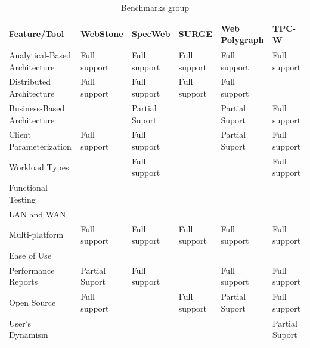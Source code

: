 \documentclass{report}
\begin{document}
\begin{table}[]
\centering
\caption{Benchmarks group}
\label{tab: tabtool1}
\begin{tabular}{|l|l|l|l|l|l|}
\hline
\rowcolor[HTML]{EFEFEF}
\textbf{Feature/Tool}         & \textbf{WebStone} & \textbf{SpecWeb} & \textbf{SURGE} & \textbf{Web Polygraph} & \textbf{TPC-W} \\ \hline
Analytical-Based Architecture & Full support      & Full support     & Full support   & Full support           & Full support   \\ \hline
Distributed Architecture      & Full support      & Full support     & Full support   & Full support           &                \\ \hline
Business-Based Architecture   &                   & Partial Suport   &                & Partial Suport         & Full support   \\ \hline
Client Parameterization       & Full support      & Full support     &                & Partial Suport         & Full support   \\ \hline
Workload Types                &                   & Full support     &                &                        & Full support   \\ \hline
Functional Testing            &                   &                  &                &                        &                \\ \hline
LAN and WAN                   &                   &                  &                &                        &                \\ \hline
Multi-platform                & Full support      & Full support     & Full support   & Full support           & Full support   \\ \hline
Ease of Use                   &                   &                  &                &                        &                \\ \hline
Performance Reports           & Partial Suport    & Full support     &                & Full support           & Full support   \\ \hline
Open Source                   & Full support      &                  & Full support   & Partial Suport         & Full support   \\ \hline
User’s Dynamism               &                   &                  &                &                        & Partial Suport \\ \hline
\end{tabular}
\end{table}
\end{document}
